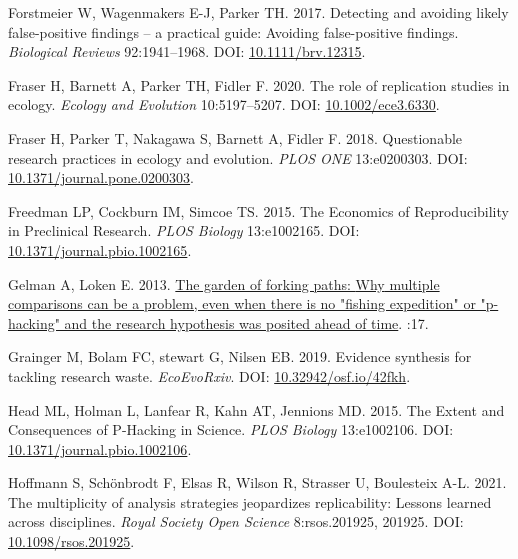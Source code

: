 \documentclass[10pt,a4paper]{article}
\newlength{\cslhangindent}
\newlength{\cslentryspacingunit} %
\newenvironment{CSLReferences}[2] %
 {%
  \setlength{\parindent}{0pt}
  \ifodd #1
  \let\oldpar\par
  \def\par{\hangindent=\cslhangindent\oldpar}
  \fi
  \setlength{\parskip}{#2\cslentryspacingunit}
 }%
 {}
\begin{document}
\begin{CSLReferences}{1}{0}
\leavevmode{}%
Forstmeier W, Wagenmakers E-J, Parker TH. 2017. Detecting and avoiding likely false-positive findings -- a practical guide: {Avoiding} false-positive findings. \emph{Biological Reviews} 92:1941--1968. DOI: \href{https://doi.org/10.1111/brv.12315}{10.1111/brv.12315}.

\leavevmode{}%
Fraser H, Barnett A, Parker TH, Fidler F. 2020. The role of replication studies in ecology. \emph{Ecology and Evolution} 10:5197--5207. DOI: \href{https://doi.org/10.1002/ece3.6330}{10.1002/ece3.6330}.

\leavevmode{}%
Fraser H, Parker T, Nakagawa S, Barnett A, Fidler F. 2018. Questionable research practices in ecology and evolution. \emph{PLOS ONE} 13:e0200303. DOI: \href{https://doi.org/10.1371/journal.pone.0200303}{10.1371/journal.pone.0200303}.

\leavevmode{}%
Freedman LP, Cockburn IM, Simcoe TS. 2015. The {Economics} of {Reproducibility} in {Preclinical} {Research}. \emph{PLOS Biology} 13:e1002165. DOI: \href{https://doi.org/10.1371/journal.pbio.1002165}{10.1371/journal.pbio.1002165}.

\leavevmode{}%
Gelman A, Loken E. 2013. \href{http://www.stat.columbia.edu/~gelman/research/unpublished/p_hacking.pdf}{The garden of forking paths: {Why} multiple comparisons can be a problem, even when there is no "fishing expedition" or "p-hacking" and the research hypothesis was posited ahead of time}. :17.

\leavevmode{}%
Grainger M, Bolam FC, stewart G, Nilsen EB. 2019. Evidence synthesis for tackling research waste. \emph{EcoEvoRxiv}. DOI: \href{https://doi.org/10.32942/osf.io/42fkh}{10.32942/osf.io/42fkh}.

\leavevmode{}%
Head ML, Holman L, Lanfear R, Kahn AT, Jennions MD. 2015. The {Extent} and {Consequences} of {P}-{Hacking} in {Science}. \emph{PLOS Biology} 13:e1002106. DOI: \href{https://doi.org/10.1371/journal.pbio.1002106}{10.1371/journal.pbio.1002106}.

\leavevmode{}%
Hoffmann S, Schönbrodt F, Elsas R, Wilson R, Strasser U, Boulesteix A-L. 2021. The multiplicity of analysis strategies jeopardizes replicability: Lessons learned across disciplines. \emph{Royal Society Open Science} 8:rsos.201925, 201925. DOI: \href{https://doi.org/10.1098/rsos.201925}{10.1098/rsos.201925}.


\end{CSLReferences}
\end{document}

